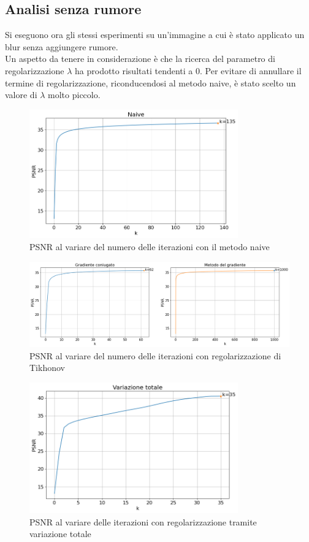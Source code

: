 \documentclass[11pt]{article}
\begin{document}
\subsection{Analisi senza rumore}
Si eseguono ora gli stessi esperimenti su un'immagine a cui è stato applicato un blur senza aggiungere rumore.\\
Un aspetto da tenere in considerazione è che la ricerca del parametro di regolarizzazione $\lambda$ ha prodotto risultati tendenti a 0. Per evitare di annullare il termine di regolarizzazione, riconducendosi al metodo naive, è stato scelto un valore di $\lambda$ molto piccolo.

\begin{figure}[H]
    \centering
    \includegraphics[width=9cm]{semiconvergenza/3/psnr_naive.png}
    \caption{PSNR al variare del numero delle iterazioni con il metodo naive}
    \label{fig:semiconv_psnr_naive3}
\end{figure}
\begin{figure}[H]
    \centering
    \includegraphics[width=15cm]{semiconvergenza/3/psnr_tikhonov.png}
    \caption{PSNR al variare del numero delle iterazioni con regolarizzazione di Tikhonov}
    \label{fig:semiconv_deblur_tikhonov3}
\end{figure}
\begin{figure}[H]
    \centering
    \includegraphics[width=9cm]{semiconvergenza/3/psnr_tv.png}
    \caption{PSNR al variare delle iterazioni con regolarizzazione tramite variazione totale}
    \label{fig:semiconv_deblur_tv3}
\end{figure}
\end{document}

